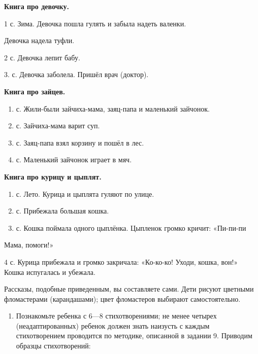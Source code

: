 \documentclass[a5paper]{book}
\begin{document}
\textbf{Книга про девочку.}

1 с. Зима. Девочка пошла гулять и забыла надеть валенки.

Девочка надела туфли.

2 с. Девочка лепит бабу.

3. с. Девочка заболела. Пришёл врач (доктор).

\textbf{Книга про зайцев.}


\begin{enumerate}
\def\labelenumi{\arabic{enumi}.}
\item
  
  с. Жили-были зайчиха-мама, заяц-папа и маленький зайчонок.
  
\item
  
  с. Зайчиха-мама варит суп.
  
\item
  
  с. Заяц-папа взял корзину и пошёл в лес.
  
\item
  
  с. Маленький зайчонок играет в мяч.
  
\end{enumerate}


\textbf{Книга про курицу и цыплят.}


\begin{enumerate}
\def\labelenumi{\arabic{enumi}.}
\item
  
  с. Лето. Курица и цыплята гуляют по улице.
  
\item
  
  с. Прибежала большая кошка.
  
\item
  
  с. Кошка поймала одного цыплёнка. Цыпленок громко кричит: «Пи-пи-пи
  
\end{enumerate}


Мама, помоги!»

4 с. Курица прибежала и громко закричала: «Ко-ко-ко! Уходи, кошка, вон!»
Кошка испугалась и убежала.

Рассказы, подобные приведенным, вы составляете сами. Дети рисуют
цветными фломастерами (карандашами); цвет фломастеров выбирают
самостоятельно.


\begin{enumerate}
\def\labelenumi{\arabic{enumi}.}
\setcounter{enumi}{7}
\item
  
  Познакомьте ребенка с 6---8 стихотворениями; не менее четырех
  (неадаптированных) ребенок должен знать наизусть с каждым
  стихотворением проводится по методике, описанной в задании 9. Приводим
  образцы стихотворений:
  
\end{enumerate}
\end{document}
